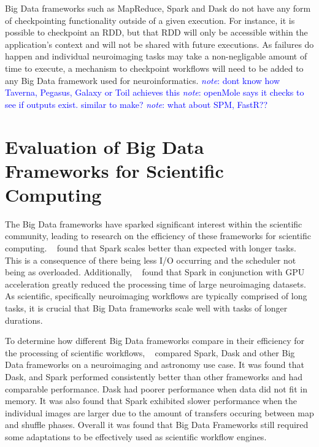 \documentclass{report}
\newcommand{\note}[1]{\textcolor{blue}{\textit{note}: #1}}
\begin{document}
            Big Data frameworks such as MapReduce, Spark and Dask do not have   
            any form of checkpointing functionality outside of a given          
            execution. For instance, it is possible to checkpoint an RDD, but   
            that RDD will only be accessible within the application's context   
            and will not be shared with future executions. As failures do       
            happen and individual neuroimaging tasks may take a non-negligable  
            amount of time to execute, a mechanism to checkpoint workflows      
            will need to be added to any Big Data framework used for             
            neuroinformatics.                                                   
            \note{dont know how Taverna, Pegasus, Galaxy or Toil achieves this} 
            \note{openMole says it checks to see if outputs exist. similar to   
            make?}                                                              
            \note{what about SPM, FastR??}                                      

                                                                                
        \section{Evaluation of Big Data Frameworks for Scientific Computing}\label{eval}     
            The Big Data frameworks have sparked significant interest within the 
            scientific community, leading to research on the efficiency of      
            these frameworks for scientific computing. ~\cite{souza2017spark} found  
            that Spark scales better than expected with longer tasks. This is   
            a consequence of there being less I/O occurring and the scheduler 
            not being as overloaded. 
            Additionally, ~\cite{boubela2016big} found that Spark in conjunction with  
            GPU acceleration greatly reduced the processing time of large       
            neuroimaging datasets.                                              
            As scientific, specifically neuroimaging workflows are typically    
            comprised of long tasks, it                                         
            is crucial that Big Data frameworks scale well with tasks of longer  
            durations.
    
            To determine how different Big Data frameworks compare in their 
            efficiency for the processing of scientific workflows, 
            ~\cite{mehta2017comparative} compared Spark, Dask and other Big Data 
            frameworks on
            a neuroimaging and astronomy use case. It was found that Dask, 
            and Spark performed consistently better than other frameworks and 
            had comparable 
            performance. Dask had poorer performance when data did not fit in
            memory. It was also found that Spark exhibited slower performance 
            when the individual images are larger due to the amount of transfers
            occuring between map and shuffle phases. Overall it was
            found that Big Data Frameworks still required some adaptations to be
            effectively used as scientific workflow engines.            
            
\end{document}
